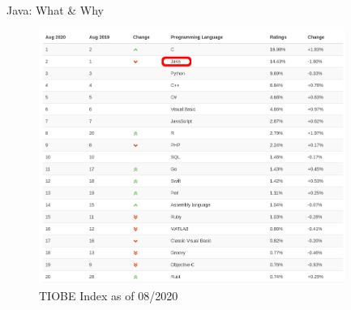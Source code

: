 \documentclass[English,c,%
hyperref={%
    pdftitle={FISA-DE2 OOP in Java},%
    pdfauthor={Muller, Gravier, Laforest, Subercaze},%
    pdfsubject={OOP in Java},%
    pdfkeywords={OOP, Java},%
    colorlinks=true,%
    urlcolor=blue,%
    linkcolor=%
    },%
xcolor={pdftex,svgnames} %
]{beamer}
\begin{document}
\begin{frame}{Java: What \& Why}
  \begin{figure}[!h]
    \begin{center}
      \includegraphics[height=8.3cm]{images01/2020_08_TIOBEIndex.png}
    \end{center}
    \caption{TIOBE Index as of 08/2020}
    \label{fig:TIOBEIdx}
  \end{figure}
\end{frame}
\end{document}
